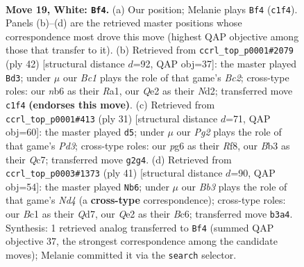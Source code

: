 \documentclass[11pt]{article}
\begin{document}
\clearpage

\begin{figure}[p]\centering
\begin{subfigure}{0.46\textwidth}\centering
\resizebox{\linewidth}{!}{%
\newchessgame
\chessboard[
  setfen={1r4k1/pp3pbp/1nn2qp1/3p1b2/3P4/1B5P/PPN1QPP1/RNB3K1 w - - 3 19},
  showmover=false,
  pgfstyle=straightmove, color=movearrow, markmove={c1-f4}
]}
\caption{}
\end{subfigure}\hfill
\begin{subfigure}{0.46\textwidth}\centering
\resizebox{\linewidth}{!}{%
\newchessgame
\chessboard[
  setfen={2q1rbk1/2p2pp1/2b1nn1p/1p2p3/1P2P3/1NP1B2P/2BNQPP1/R5K1 w - - 4 22},
  showmover=false,
  pgfstyle=straightmove, color=movearrow, markmove={c2-d3}
]}
\caption{}
\end{subfigure}
\\[4pt]
\begin{subfigure}{0.46\textwidth}\centering
\resizebox{\linewidth}{!}{%
\newchessgame
\chessboard[
  setfen={5rk1/2q1bpp1/Bn1pbn1p/4p3/4P3/1NN1B2P/1PP1QPP1/5RK1 b - - 0 16},
  showmover=false,
  pgfstyle=straightmove, color=movearrow, markmove={d6-d5}
]}
\caption{}
\end{subfigure}\hfill
\begin{subfigure}{0.46\textwidth}\centering
\resizebox{\linewidth}{!}{%
\newchessgame
\chessboard[
  setfen={r5k1/2pq1p2/2b2bp1/1p1n3p/p2P4/N1PQ4/PPBB1PPP/3R2K1 b - - 5 21},
  showmover=false,
  pgfstyle=straightmove, color=movearrow, markmove={d5-b6}
]}
\caption{}
\end{subfigure}
\caption{\textbf{Move 19, White: \texttt{Bf4}.} (a) Our position; Melanie plays \texttt{Bf4} (\texttt{c1f4}). Panels (b)--(d) are the retrieved master positions whose correspondence most drove this move (highest QAP objective among those that transfer to it). (b) Retrieved from \texttt{ccrl\_top\_p0001\#2079} (ply 42) [structural distance $d$=92, QAP obj=37]: the master played \texttt{Bd3}; under $\mu$ our \emph{Bc1} plays the role of that game's \emph{Bc2}; cross-type roles: our \emph{n}b6 as their \emph{R}a1, our \emph{Q}e2 as their \emph{N}d2; transferred move \texttt{c1f4} \textbf{(endorses this move)}. (c) Retrieved from \texttt{ccrl\_top\_p0001\#413} (ply 31) [structural distance $d$=71, QAP obj=60]: the master played \texttt{d5}; under $\mu$ our \emph{Pg2} plays the role of that game's \emph{Pd3}; cross-type roles: our \emph{p}g6 as their \emph{R}f8, our \emph{B}b3 as their \emph{Q}c7; transferred move \texttt{g2g4}. (d) Retrieved from \texttt{ccrl\_top\_p0003\#1373} (ply 41) [structural distance $d$=90, QAP obj=54]: the master played \texttt{Nb6}; under $\mu$ our \emph{Bb3} plays the role of that game's \emph{Nd4} (a \textbf{cross-type} correspondence); cross-type roles: our \emph{B}c1 as their \emph{Q}d7, our \emph{Q}e2 as their \emph{B}c6; transferred move \texttt{b3a4}. Synthesis: 1 retrieved analog transferred to \texttt{Bf4} (summed QAP objective 37, the strongest correspondence among the candidate moves); Melanie committed it via the \texttt{search} selector.}
\label{fig:thought-m36}
\end{figure}
\end{document}
